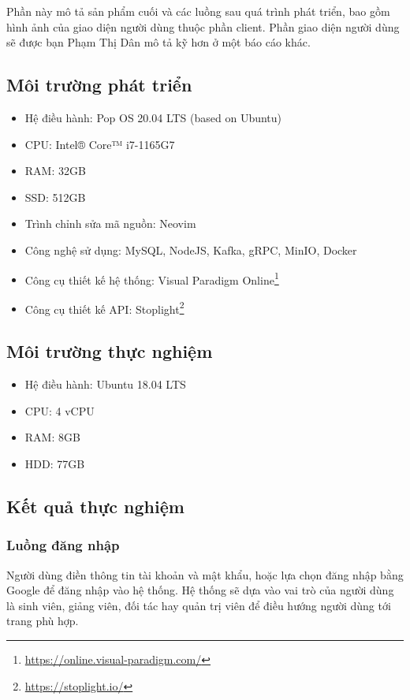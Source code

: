\documentclass[./../main.tex]{subfiles}
\begin{document}
Phần này mô tả sản phẩm cuối và các luồng sau quá trình phát triển, bao gồm hình ảnh của giao diện người dùng thuộc phần client. Phần giao diện người dùng sẽ được bạn Phạm Thị Dân mô tả kỹ hơn ở một báo cáo khác.

\subsection{Môi trường phát triển}

\begin{itemize}
	\item Hệ điều hành: Pop OS 20.04 LTS (based on Ubuntu)
	\item CPU: Intel® Core™ i7-1165G7
	\item RAM: 32GB
	\item SSD: 512GB
	\item Trình chỉnh sửa mã nguồn: Neovim
	\item Công nghệ sử dụng: MySQL, NodeJS, Kafka, gRPC, MinIO, Docker
	\item Công cụ thiết kế hệ thống: Visual Paradigm Online\footnote{\url{https://online.visual-paradigm.com/}}
	\item Công cụ thiết kế API: Stoplight\footnote{\url{https://stoplight.io/}}
\end{itemize}

\subsection{Môi trường thực nghiệm}

\begin{itemize}
	\item Hệ điều hành: Ubuntu 18.04 LTS
	\item CPU: 4 vCPU
	\item RAM: 8GB
	\item HDD: 77GB
\end{itemize}

\subsection{Kết quả thực nghiệm}

\subsubsection{Luồng đăng nhập}

Người dùng điền thông tin tài khoản và mật khẩu, hoặc lựa chọn đăng nhập
bằng Google để đăng nhập vào hệ thống. Hệ thống sẽ dựa vào vai trò của
người dùng là sinh viên, giảng viên, đối tác hay quản trị viên để điều
hướng người dùng tới trang phù hợp.
\end{document}
